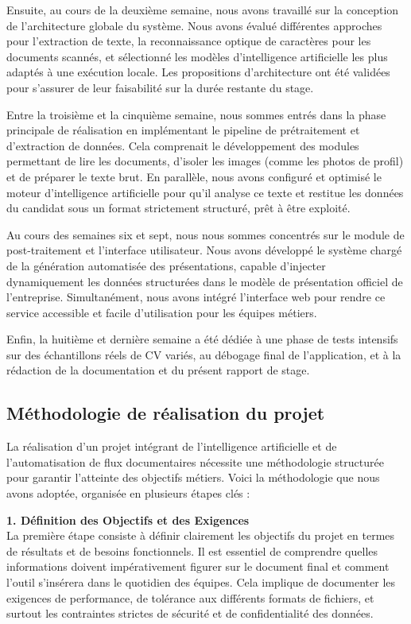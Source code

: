 Ensuite, au cours de la deuxième semaine, nous avons travaillé sur la conception de l'architecture globale du système. Nous avons évalué différentes approches pour l'extraction de texte, la reconnaissance optique de caractères pour les documents scannés, et sélectionné les modèles d'intelligence artificielle les plus adaptés à une exécution locale. Les propositions d'architecture ont été validées pour s'assurer de leur faisabilité sur la durée restante du stage.

Entre la troisième et la cinquième semaine, nous sommes entrés dans la phase principale de réalisation en implémentant le pipeline de prétraitement et d'extraction de données. Cela comprenait le développement des modules permettant de lire les documents, d'isoler les images (comme les photos de profil) et de préparer le texte brut. En parallèle, nous avons configuré et optimisé le moteur d'intelligence artificielle pour qu'il analyse ce texte et restitue les données du candidat sous un format strictement structuré, prêt à être exploité.

Au cours des semaines six et sept, nous nous sommes concentrés sur le module de post-traitement et l'interface utilisateur. Nous avons développé le système chargé de la génération automatisée des présentations, capable d'injecter dynamiquement les données structurées dans le modèle de présentation officiel de l'entreprise. Simultanément, nous avons intégré l'interface web pour rendre ce service accessible et facile d'utilisation pour les équipes métiers.

Enfin, la huitième et dernière semaine a été dédiée à une phase de tests intensifs sur des échantillons réels de CV variés, au débogage final de l'application, et à la rédaction de la documentation et du présent rapport de stage.



\subsection{Méthodologie de réalisation du projet}
La réalisation d'un projet intégrant de l'intelligence artificielle et de l'automatisation de flux documentaires nécessite une méthodologie structurée pour garantir l'atteinte des objectifs métiers. Voici la méthodologie que nous avons adoptée, organisée en plusieurs étapes clés :

\textbf{1. Définition des Objectifs et des Exigences} \\
La première étape consiste à définir clairement les objectifs du projet en termes de résultats et de besoins fonctionnels. Il est essentiel de comprendre quelles informations doivent impérativement figurer sur le document final et comment l'outil s'insérera dans le quotidien des équipes. Cela implique de documenter les exigences de performance, de tolérance aux différents formats de fichiers, et surtout les contraintes strictes de sécurité et de confidentialité des données.

